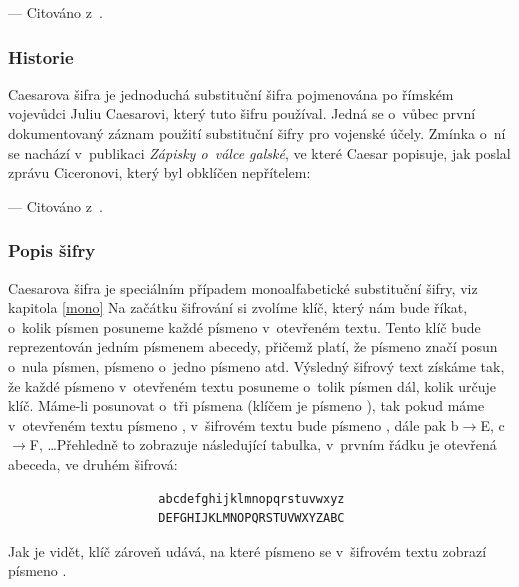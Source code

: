 \documentclass[12pt]{article}
\theoremstyle{definition}
\newcommand{\cit}[1]{--- Citováno z~\cite{#1}.}
\begin{document}
\cit{cryptography}

\subsubsection{Historie}
Caesarova šifra je jednoduchá substituční šifra pojmenována po římském vojevůdci Juliu Caesarovi, který tuto šifru používal. Jedná se o~vůbec první dokumentovaný záznam použití substituční šifry pro vojenské účely. Zmínka o~ní se nachází v~publikaci {\em Zápisky o~válce galské}, ve které Caesar popisuje, jak poslal zprávu Ciceronovi, který byl obklíčen nepřítelem: 

\begin{quotation} 
\end{quotation}

\cit{singh}

\subsubsection{Popis šifry}
Caesarova šifra je speciálním případem monoalfabetické substituční šifry, viz kapitola \ref{mono} Na začátku šifrování si zvolíme klíč, který nám bude říkat, o~kolik písmen posuneme každé písmeno v~otevřeném textu. Tento klíč bude reprezentován jedním písmenem abecedy, přičemž platí, že písmeno  značí posun o~nula písmen, písmeno  o~jedno písmeno atd. Výsledný šifrový text získáme tak, že každé písmeno v~otevřeném textu posuneme o~tolik písmen dál, kolik určuje klíč. Máme-li posunovat o~tři písmena (klíčem je písmeno ), tak pokud máme v~otevřeném textu písmeno , v~šifrovém textu bude písmeno , dále pak b$\rightarrow$E, c$\rightarrow$F, \dots Přehledně to zobrazuje následující tabulka, v~prvním řádku je otevřená abeceda, ve druhém šifrová:

\begin{verbatim}
                     abcdefghijklmnopqrstuvwxyz
                     DEFGHIJKLMNOPQRSTUVWXYZABC
\end{verbatim}

Jak je vidět, klíč zároveň udává, na které písmeno se v~šifrovém textu zobrazí písmeno . 
\end{document}
